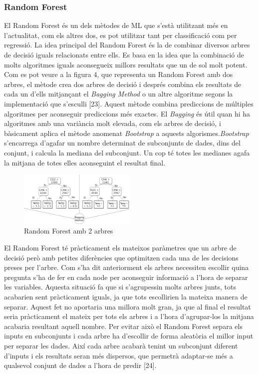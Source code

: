 \documentclass[10pt,a4paper,twocolumn,twoside]{article}
\begin{document}
\subsubsection{Random Forest}
El Random Forest és un dels mètodes de ML que s'està utilitzant més en l'actualitat, com els altres dos, es pot utilitzar tant per classificació com per regressió. La idea principal del Random Forest és la de combinar diversos arbres de decisió iguals relacionats entre ells. Es basa en la idea que la combinació de molts algoritmes iguals aconsegueix millors resultats que un de sol molt potent. Com es pot veure a la figura 4, que representa un Random Forest amb dos arbres, el mètode crea dos arbres de decisió i després combina els resultats de cada un d'ells mitjançant el \textit{Bagging Method} o un altre algoritme segons la implementació que s'esculli [23]. Aquest mètode combina prediccions de múltiples algoritmes per aconseguir prediccions més exactes. El \textit{Bagging} és útil quan hi ha algoritmes amb una variància molt elevada, com els arbres de decisió, i bàsicament aplica el mètode anomenat \textit{Bootstrap} a aquests algorismes.\textit{Bootstrap} s'encarrega d'agafar un nombre determinat de subconjunts de dades, dins del conjunt, i calcula la mediana del subconjunt. Un cop té totes les medianes agafa la mitjana de totes elles aconseguint el resultat final.
\begin{figure}[!h]
\centering
	\includegraphics[width=0.5\textwidth]{../img/randomForest}
	\caption{Random Forest amb 2 arbres}
	\label{fig-RandomForest}
\end{figure}

El Random Forest té pràcticament els mateixos paràmetres que un arbre de decisió però amb petites diferències que optimitzen cada una de les decisions preses per l'arbre. Com s'ha dit anteriorment els arbres necessiten escollir quina pregunta s'ha de fer en cada node per aconseguir informació a l'hora de separar les variables. Aquesta situació fa que si s'agrupessin molts arbres junts, tots acabarien sent pràcticament iguals, ja que tots escollirien la mateixa manera de separar. Aquest fet no aportaria una millora molt gran, ja que al final el resultat seria pràcticament el mateix per tots els arbres i a l'hora d'agrupar-los la mitjana acabaria resultant aquell nombre. Per evitar això el Random Forest separa els inputs en subconjunts i cada arbre ha d'escollir de forma aleatòria el millor input per separar les dades. Així cada arbre acabarà tenint un subconjunt diferent d'inputs i els resultats seran més dispersos, que permetrà adaptar-se més a qualsevol conjunt de dades a l'hora de predir [24].
\end{document}
